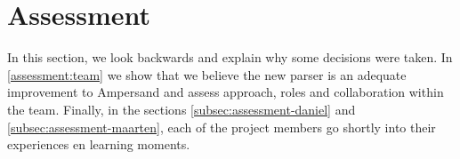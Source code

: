 
\clearpage
\section{Assessment}
\label{sec:assessment}
In this section, we look backwards and explain why some decisions were taken.
In \ref{assessment:team} we show that we believe the new parser is an adequate improvement to Ampersand and assess approach, roles and collaboration within the team.
Finally, in the sections \ref{subsec:assessment-daniel} and \ref{subsec:assessment-maarten}, each of the project members go shortly into their experiences en learning moments.




